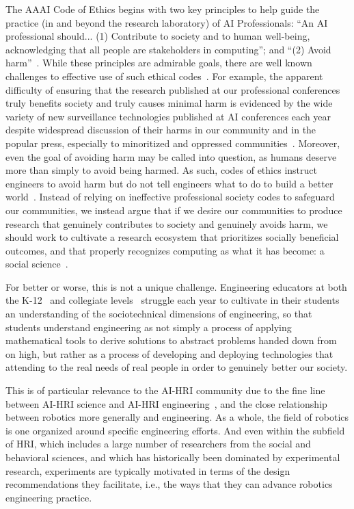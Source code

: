 \documentclass[letterpaper]{article} %
\begin{document}
The AAAI Code of Ethics begins with two key principles to help guide the practice (in and beyond the research laboratory) of AI Professionals: ``An AI professional should... (1) Contribute to society and to human well-being, acknowledging that all people are stakeholders in computing''; and ``(2) Avoid harm''~\cite{aaai2019aaai}. While these principles are admirable goals, there are well known challenges to effective use of such ethical codes~\cite{giorgini2015researcher}.
For example, the apparent difficulty of ensuring that the research published at our professional conferences truly benefits society and truly causes minimal harm is evidenced by the wide variety of new surveillance technologies published at AI conferences each year despite widespread discussion of their harms in our community and in the popular press, especially to minoritized and oppressed communities~\cite{gebru2020race}. Moreover, even the goal of avoiding harm may be called into question, as humans deserve more than simply to avoid being harmed. As such, codes of ethics instruct engineers to avoid harm but do not tell engineers what to do to build a better world~\cite{harris2008good}.
Instead of relying on ineffective professional society codes to safeguard our communities, we instead argue that if we desire our communities to produce research that genuinely contributes to society and genuinely avoids harm, we should work to cultivate a research ecosystem that prioritizes socially beneficial outcomes, and that properly recognizes computing as what it has become: a social science~\cite{connolly2020computing}.

For better or worse, this is not a unique challenge. Engineering educators at both the K-12~\cite{mcgowan2020engineering} and collegiate levels~\cite{swartz2019sociotechnical} struggle each year to cultivate in their students an understanding of the sociotechnical dimensions of engineering, so that students understand engineering as not simply a process of applying mathematical tools to derive solutions to abstract problems handed down from on high, but rather as a process of developing and deploying technologies that attending to the real needs of real people in order to genuinely better our society.

This is of particular relevance to the AI-HRI community due to the fine line between AI-HRI science and AI-HRI engineering~\cite{depalma2014quis}, and the
close relationship between robotics more generally and engineering. As a whole, the field of robotics is one organized around specific engineering efforts. And even within the subfield of HRI, which includes a large number of researchers from the social and behavioral sciences, and which has historically been dominated by experimental research, experiments are typically motivated in terms of the design recommendations they facilitate, i.e., the ways that they can advance robotics engineering practice.
\end{document}
